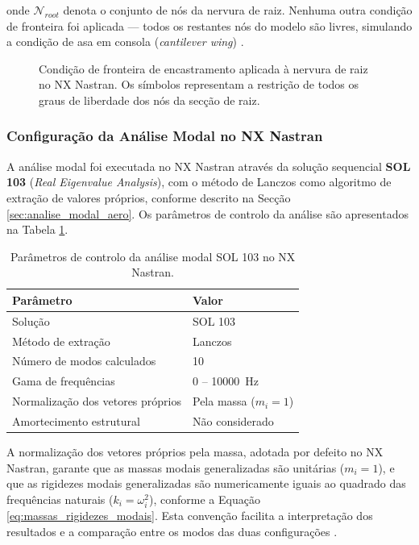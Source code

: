 \documentclass[a4paper,fleqn,noprintline]{cas-dc}
\begin{document}
\noindent onde $\mathcal{N}_{root}$ denota o conjunto de nós da nervura de raiz. Nenhuma outra condição de fronteira foi aplicada --- todos os restantes nós do modelo são livres, simulando a condição de asa em consola (\textit{cantilever wing}) \cite{Bisplinghoff1996}.

\begin{figure}[h!]
    \centering
    \caption{Condição de fronteira de encastramento aplicada à nervura de raiz no NX Nastran. Os símbolos representam a restrição de todos os graus de liberdade dos nós da secção de raiz.}
    \label{fig:bc_nx}
\end{figure}

\subsubsection{Configuração da Análise Modal no NX Nastran}

A análise modal foi executada no NX Nastran através da solução sequencial \textbf{SOL 103} (\textit{Real Eigenvalue Analysis}), com o método de Lanczos como algoritmo de extração de valores próprios, conforme descrito na Secção \ref{sec:analise_modal_aero}. Os parâmetros de controlo da análise são apresentados na Tabela \ref{tab:sol103}.

\begin{table}[h!]
\centering
\caption{Parâmetros de controlo da análise modal SOL 103 
no NX Nastran.}
\label{tab:sol103}
\renewcommand{\arraystretch}{1.4}
\begin{tabularx}{\textwidth}{p{5cm} X}
\toprule
\textbf{Parâmetro} & \textbf{Valor} \\
\midrule
Solução                         & SOL 103 \\
Método de extração              & Lanczos \\
Número de modos calculados      & 10 \\
Gama de frequências             & $0$ -- \SI{10000}{\hertz} \\
Normalização dos vetores próprios & Pela massa ($m_i = 1$) \\
Amortecimento estrutural        & Não considerado \\
\bottomrule
\end{tabularx}
\end{table}

A normalização dos vetores próprios pela massa, adotada por defeito no NX Nastran, garante que as massas modais generalizadas são unitárias ($m_i = 1$), e que as rigidezes modais generalizadas são numericamente iguais ao quadrado das frequências naturais ($k_i = \omega_i^2$), conforme a Equação \eqref{eq:massas_rigidezes_modais}. Esta convenção facilita a interpretação dos resultados e a comparação entre os modos das duas configurações \cite{Nastran2014, Craig2006}.
\end{document}
